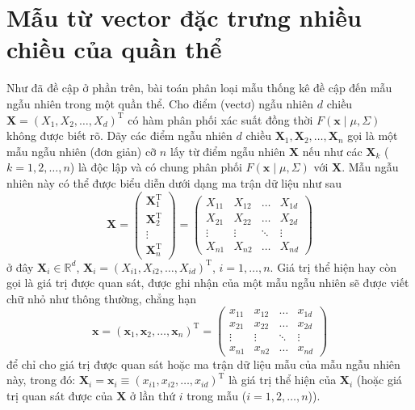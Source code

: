 \section{Mẫu từ vector đặc trưng nhiều chiều của quần thể}


Như đã đề cập ở phần trên, bài toán phân loại mẫu thống kê đề cập đến mẫu ngẫu nhiên trong một quần thể. Cho điểm (vectơ) ngẫu nhiên $d$ chiều $\bm{X} = (X_1, X_2, \dots, X_d)^\text{T}$ có hàm phân phối xác suất đồng thời $F(\bm{x} \mid \mu, \Sigma)$ không được biết rõ. Dãy các điểm ngẫu nhiên $d$ chiều $\bm{X}_1, \bm{X}_2, \dots, \bm{X}_n$ gọi là một mẫu ngẫu nhiên (đơn giản) cỡ $n$ lấy từ điểm ngẫu nhiên $\bm{X}$ nếu như các $\bm{X}_k$ ($k = 1, 2, \dots, n$) là độc lập và có chung phân phối $F(\bm{x} \mid \mu, \Sigma)$ với $\bm{X}$. Mẫu ngẫu nhiên này có thể được biểu diễn dưới dạng ma trận dữ liệu như sau
\begin{equation*}
	\mathbf{X} = 
	\begin{pmatrix}
		\bm{X}_1^\text{T} \\
		\bm{X}_2^\text{T} \\
		\vdots \\
		\bm{X}_n^\text{T}
	\end{pmatrix}
	=
	\begin{pmatrix}
		X_{11} & X_{12} & \dots & X_{1d} \\
		X_{21} & X_{22} & \dots & X_{2d} \\
		\vdots & \vdots & \ddots & \vdots \\
		X_{n1} & X_{n2} & \dots & X_{nd}
	\end{pmatrix}
\end{equation*} ở đây $\bm{X}_i \in \mathbb{R}^d$, $\bm{X}_i = (X_{i1}, X_{i2}, \dots, X_{id})^\text{T}$, $i = 1, \dots, n$. Giá trị thể hiện hay còn gọi là giá trị được quan sát, được ghi nhận của một mẫu ngẫu nhiên sẽ được viết chữ nhỏ như thông thường, chẳng hạn
\begin{equation*}
	\bm{x} = (\bm{x}_1, \bm{x}_2, \dots, \bm{x}_n)^\text{T} = 
	\begin{pmatrix}
		x_{11} & x_{12} & \dots & x_{1d} \\
		x_{21} & x_{22} & \dots & x_{2d} \\
		\vdots & \vdots & \ddots & \vdots \\
		x_{n1} & x_{n2} & \dots & x_{nd}
	\end{pmatrix}
\end{equation*} để chỉ cho giá trị được quan sát hoặc ma trận dữ liệu mẫu của mẫu ngẫu nhiên này, trong đó: $\bm{X}_i = \bm{x}_i \equiv (x_{i1}, x_{i2}, \dots, x_{id})^\text{T}$ là giá trị thể hiện của $\bm{X}_i$ (hoặc giá trị quan sát được của $\bm{X}$ ở lần thứ $i$ trong mẫu ($i = 1, 2, \dots, n$)).

